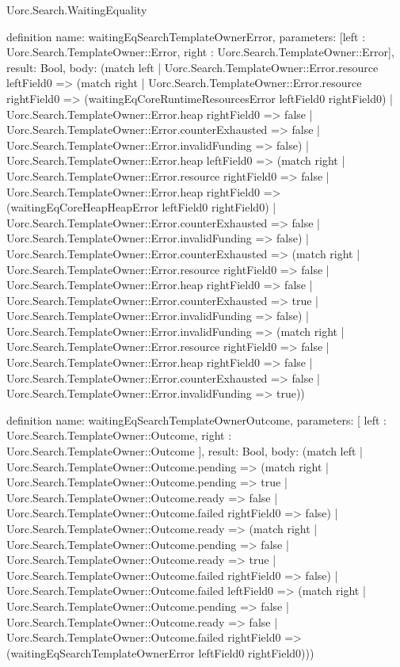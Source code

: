 \begin{lexlean}{Uorc.Search.WaitingEquality}
\begin{semanticmodule}
definition{
  name: waitingEqSearchTemplateOwnerError,
  parameters: [left : Uorc.Search.TemplateOwner::Error, right : Uorc.Search.TemplateOwner::Error],
  result: Bool,
  body: (match left
    | Uorc.Search.TemplateOwner::Error.resource leftField0 => (match right
      | Uorc.Search.TemplateOwner::Error.resource rightField0 => (waitingEqCoreRuntimeResourcesError leftField0 rightField0)
      | Uorc.Search.TemplateOwner::Error.heap rightField0 => false
      | Uorc.Search.TemplateOwner::Error.counterExhausted => false
      | Uorc.Search.TemplateOwner::Error.invalidFunding => false)
    | Uorc.Search.TemplateOwner::Error.heap leftField0 => (match right
      | Uorc.Search.TemplateOwner::Error.resource rightField0 => false
      | Uorc.Search.TemplateOwner::Error.heap rightField0 => (waitingEqCoreHeapHeapError leftField0 rightField0)
      | Uorc.Search.TemplateOwner::Error.counterExhausted => false
      | Uorc.Search.TemplateOwner::Error.invalidFunding => false)
    | Uorc.Search.TemplateOwner::Error.counterExhausted => (match right
      | Uorc.Search.TemplateOwner::Error.resource rightField0 => false
      | Uorc.Search.TemplateOwner::Error.heap rightField0 => false
      | Uorc.Search.TemplateOwner::Error.counterExhausted => true
      | Uorc.Search.TemplateOwner::Error.invalidFunding => false)
    | Uorc.Search.TemplateOwner::Error.invalidFunding => (match right
      | Uorc.Search.TemplateOwner::Error.resource rightField0 => false
      | Uorc.Search.TemplateOwner::Error.heap rightField0 => false
      | Uorc.Search.TemplateOwner::Error.counterExhausted => false
      | Uorc.Search.TemplateOwner::Error.invalidFunding => true))
}

definition{
  name: waitingEqSearchTemplateOwnerOutcome,
  parameters: [
    left : Uorc.Search.TemplateOwner::Outcome,
    right : Uorc.Search.TemplateOwner::Outcome
  ],
  result: Bool,
  body: (match left
    | Uorc.Search.TemplateOwner::Outcome.pending => (match right
      | Uorc.Search.TemplateOwner::Outcome.pending => true
      | Uorc.Search.TemplateOwner::Outcome.ready => false
      | Uorc.Search.TemplateOwner::Outcome.failed rightField0 => false)
    | Uorc.Search.TemplateOwner::Outcome.ready => (match right
      | Uorc.Search.TemplateOwner::Outcome.pending => false
      | Uorc.Search.TemplateOwner::Outcome.ready => true
      | Uorc.Search.TemplateOwner::Outcome.failed rightField0 => false)
    | Uorc.Search.TemplateOwner::Outcome.failed leftField0 => (match right
      | Uorc.Search.TemplateOwner::Outcome.pending => false
      | Uorc.Search.TemplateOwner::Outcome.ready => false
      | Uorc.Search.TemplateOwner::Outcome.failed rightField0 => (waitingEqSearchTemplateOwnerError leftField0 rightField0)))
}
\end{semanticmodule}
\end{lexlean}
